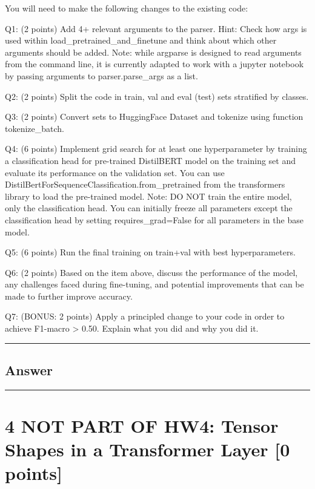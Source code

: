 \documentclass[
  letterpaper,
  DIV=11,
  numbers=noendperiod]{scrartcl}
\begin{document}
You will need to make the following changes to the existing code:

Q1: (2 points) Add 4+ relevant arguments to the parser. Hint: Check how
args is used within load\_pretrained\_and\_finetune and think about
which other arguments should be added. Note: while argparse is designed
to read arguments from the command line, it is currently adapted to work
with a jupyter notebook by passing arguments to parser.parse\_args as a
list.

Q2: (2 points) Split the code in train, val and eval (test) sets
stratified by classes.

Q3: (2 points) Convert sets to HuggingFace Dataset and tokenize using
function tokenize\_batch.

Q4: (6 points) Implement grid search for at least one hyperparameter by
training a classification head for pre-trained DistilBERT model on the
training set and evaluate its performance on the validation set. You can
use DistilBertForSequenceClassification.from\_pretrained from the
transformers library to load the pre-trained model. Note: DO NOT train
the entire model, only the classification head. You can initially freeze
all parameters except the classification head by setting
requires\_grad=False for all parameters in the base model.

Q5: (6 points) Run the final training on train+val with best
hyperparameters.

Q6: (2 points) Based on the item above, discuss the performance of the
model, any challenges faced during fine-tuning, and potential
improvements that can be made to further improve accuracy.

Q7: (BONUS: 2 points) Apply a principled change to your code in order to
achieve F1-macro \textgreater{} 0.50. Explain what you did and why you
did it.

\begin{center}\rule{0.5\linewidth}{0.5pt}\end{center}

\subsection{Answer}\label{answer-2}

\begin{center}\rule{0.5\linewidth}{0.5pt}\end{center}

\section{4 NOT PART OF HW4: Tensor Shapes in a Transformer Layer {[}0
points{]}}\label{not-part-of-hw4-tensor-shapes-in-a-transformer-layer-0-points}
\end{document}
